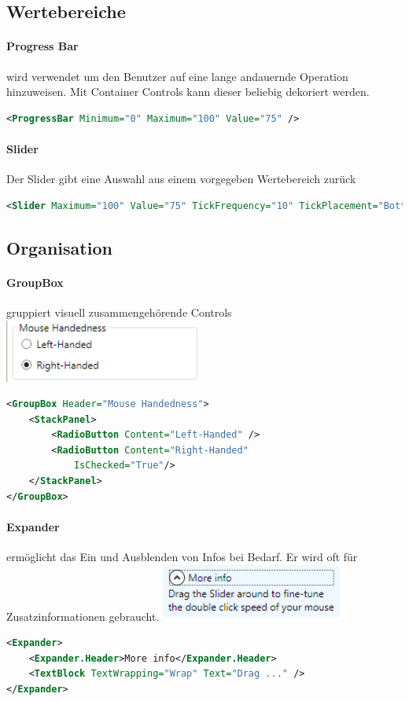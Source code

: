\subsection{Wertebereiche}
\paragraph{Progress Bar} wird verwendet um den Benutzer auf eine lange andauernde Operation hinzuweisen. Mit Container Controls kann dieser beliebig dekoriert werden. 
\begin{lstlisting}[language=xml]
<ProgressBar Minimum="0" Maximum="100" Value="75" />
\end{lstlisting}
\paragraph{Slider} Der Slider gibt eine Auswahl aus einem vorgegeben Wertebereich zurück
\begin{lstlisting}[language=xml]
<Slider Maximum="100" Value="75" TickFrequency="10" TickPlacement="BottomRight" />
\end{lstlisting}
\subsection{Organisation}
\paragraph{GroupBox} gruppiert visuell zusammengehörende Controls
\includegraphics[scale=0.3]{img/GroupBox.png}
\begin{lstlisting}[language=xml]
<GroupBox Header="Mouse Handedness">
    <StackPanel>
        <RadioButton Content="Left-Handed" />
        <RadioButton Content="Right-Handed"
            IsChecked="True"/>
    </StackPanel>
</GroupBox>
\end{lstlisting}
\paragraph{Expander} ermöglicht das Ein und Ausblenden von Infos bei Bedarf. Er wird oft für Zusatzinformationen gebraucht.
\includegraphics[scale=0.3]{img/expander.png}
\begin{lstlisting}[language=xml]
<Expander>
    <Expander.Header>More info</Expander.Header>
    <TextBlock TextWrapping="Wrap" Text="Drag ..." />
</Expander>
\end{lstlisting}
